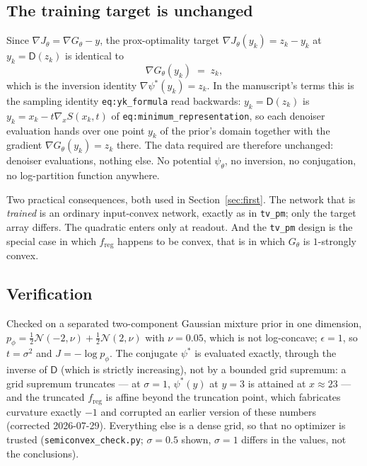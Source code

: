 \documentclass[11pt]{article}
\theoremstyle{definition}
\newcommand{\D}{\mathsf{D}}
\newcommand{\freg}{f_{\mathrm{reg}}}
\newcommand{\code}[1]{\texttt{#1}}
\begin{document}
\subsection{The training target is unchanged}

Since $\nabla J_\theta = \nabla G_\theta - y$, the prox-optimality target $\nabla J_\theta(y_k) = z_k-y_k$ at $y_k = \D(z_k)$ is identical to
\begin{equation}
\label{eq:target}
\nabla G_\theta(y_k) \;=\; z_k ,
\end{equation}
which is the inversion identity $\nabla\psi^*(y_k) = z_k$. In the manuscript's terms this is the sampling identity \code{eq:yk\_formula} read backwards: $y_k = \D(z_k)$ is $y_k = x_k - t\nabla_x S(x_k,t)$ of \code{eq:minimum\_representation}, so each denoiser evaluation hands over one point $y_k$ of the prior's domain together with the gradient $\nabla G_\theta(y_k) = z_k$ there. The data required are therefore unchanged: denoiser evaluations, nothing else. No potential $\psi_\theta$, no inversion, no conjugation, no log-partition function anywhere.

Two practical consequences, both used in Section~\ref{sec:first}. The network that is \emph{trained} is an ordinary input-convex network, exactly as in \code{tv\_pm}; only the target array differs. The quadratic enters only at readout. And the \code{tv\_pm} design is the special case in which $\freg$ happens to be convex, that is in which $G_\theta$ is $1$-strongly convex.

\subsection{Verification}
\label{sec:verif_class}

Checked on a separated two-component Gaussian mixture prior in one dimension, $p_\phi = \tfrac12\mathcal{N}(-2,\nu) + \tfrac12\mathcal{N}(2,\nu)$ with $\nu = 0.05$, which is not log-concave; $\epsilon = 1$, so $t = \sigma^2$ and $J = -\log p_\phi$. The conjugate $\psi^*$ is evaluated exactly, through the inverse of $\D$ (which is strictly increasing), not by a bounded grid supremum: a grid supremum truncates — at $\sigma = 1$, $\psi^*(y)$ at $y = 3$ is attained at $x \approx 23$ — and the truncated $\freg$ is affine beyond the truncation point, which fabricates curvature exactly $-1$ and corrupted an earlier version of these numbers (corrected 2026-07-29). Everything else is a dense grid, so that no optimizer is trusted (\code{semiconvex\_check.py}; $\sigma = 0.5$ shown, $\sigma = 1$ differs in the values, not the conclusions).
\end{document}
